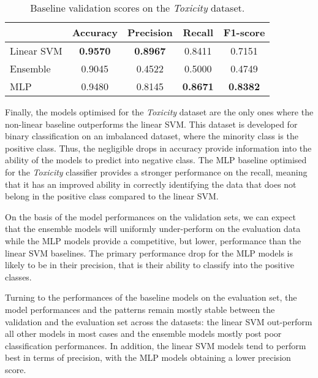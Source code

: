 \begin{table}[h]
  \centering
  \begin{tabular}{l|cccc}
                & Accuracy        & Precision       & Recall          & F1-score        \\ \hline
    Linear SVM  & \textbf{0.9570} & \textbf{0.8967} & 0.8411          & 0.7151          \\
    Ensemble    & 0.9045          & 0.4522          & 0.5000          & 0.4749          \\
    MLP         & 0.9480          & 0.8145          & \textbf{0.8671} & \textbf{0.8382}
  \end{tabular}
  \caption{Baseline validation scores on the \textit{Toxicity} dataset.}
  \label{tab:baseline_dev_wulczyn}
\end{table}

Finally, the models optimised for the \textit{Toxicity} dataset are the only ones where the non-linear baseline outperforms the linear SVM.
This dataset is developed for binary classification on an imbalanced dataset, where the minority class is the positive class.
Thus, the negligible drops in accuracy provide information into the ability of the models to predict into negative class.
The MLP baseline optimised for the \textit{Toxicity} classifier provides a stronger performance on the recall, meaning that it has an improved ability in correctly identifying the data that does not belong in the positive class compared to the linear SVM.

On the basis of the model performances on the validation sets, we can expect that the ensemble models will uniformly under-perform on the evaluation data while the MLP models provide a competitive, but lower, performance than the linear SVM baselines.
The primary performance drop for the MLP models is likely to be in their precision, that is their ability to classify into the positive classes.\vspace{5mm}

Turning to the performances of the baseline models on the evaluation set, the model performances and the patterns remain mostly stable between the validation and the evaluation set across the datasets: the linear SVM out-perform all other models in most cases and the ensemble models mostly post poor classification performances.
In addition, the linear SVM models tend to perform best in terms of precision, with the MLP models obtaining a lower precision score.

